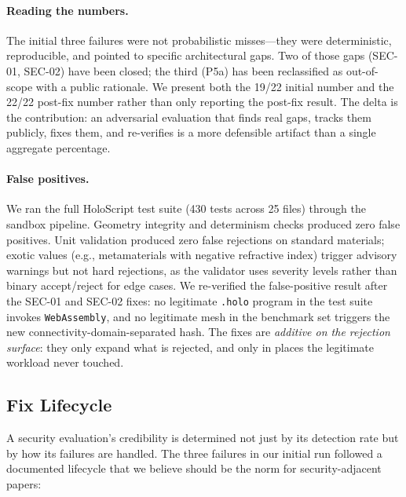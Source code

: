 \documentclass[letterpaper,twocolumn,10pt]{article}
\newcommand{\holoscript}{HoloScript}
\begin{document}
\paragraph{Reading the numbers.} The initial three failures were
not probabilistic misses---they were deterministic, reproducible, and
pointed to specific architectural gaps. Two of those gaps (SEC-01,
SEC-02) have been closed; the third (P5a) has been reclassified as
out-of-scope with a public rationale. We present both the 19/22
initial number and the 22/22 post-fix number rather than only
reporting the post-fix result. The delta is the contribution: an
adversarial evaluation that finds real gaps, tracks them publicly,
fixes them, and re-verifies is a more defensible artifact than a
single aggregate percentage.

\paragraph{False positives.} We ran the full \holoscript{} test suite
(430 tests across 25 files) through the sandbox pipeline. Geometry
integrity and determinism checks produced zero false positives. Unit
validation produced zero false rejections on standard materials; exotic
values (e.g., metamaterials with negative refractive index) trigger
advisory warnings but not hard rejections, as the validator uses
severity levels rather than binary accept/reject for edge cases. We
re-verified the false-positive result after the SEC-01 and SEC-02
fixes: no legitimate \texttt{.holo} program in the test suite invokes
\texttt{WebAssembly}, and no legitimate mesh in the benchmark set
triggers the new connectivity-domain-separated hash. The fixes are
\emph{additive on the rejection surface}: they only expand what is
rejected, and only in places the legitimate workload never touched.

\subsection{Fix Lifecycle}
\label{sec:fixlifecycle}

A security evaluation's credibility is determined not just by its
detection rate but by how its failures are handled. The three failures
in our initial run followed a documented lifecycle that we believe
should be the norm for security-adjacent papers:
\end{document}
